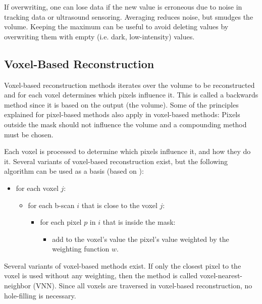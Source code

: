 	If overwriting, one can lose data if the new value is erroneous due to noise in tracking data or ultrasound sensoring. Averaging reduces noise, but smudges the volume. Keeping the maximum can be useful to avoid deleting values by overwriting them with empty (i.e. dark, low-intensity) values.

\subsection{Voxel-Based Reconstruction}

	Voxel-based reconstruction methods iterates over the volume to be reconstructed and for each voxel determines which pixels influence it. This is called a backwards method since it is based on the output (the volume). Some of the principles explained for pixel-based methods also apply in voxel-based methods: Pixels outside the mask should not influence the volume and a compounding method must be chosen.
	
	Each voxel is processed to determine which pixels influence it, and how they do it. Several variants of voxel-based reconstruction exist, but the following algorithm can be used as a basis (based on \cite{solberg2007}):
	
	\begin{itemize}
		\item for each voxel $j$:
		\begin{itemize}
			\item for each b-scan $i$ that is close to the voxel $j$:
			\begin{itemize}
				\item for each pixel $p$ in $i$ that is inside the mask:
				\begin{itemize}
					\item add to the voxel's value the pixel's value weighted by the weighting function $w$.
				\end{itemize}
			\end{itemize}
		\end{itemize}
	\end{itemize}
	
	Several variants of voxel-based methods exist. If only the closest pixel to the voxel is used without any weighting, then the method is called voxel-nearest-neighbor (VNN). Since all voxels are traversed in voxel-based reconstruction, no hole-filling is necessary.
	

